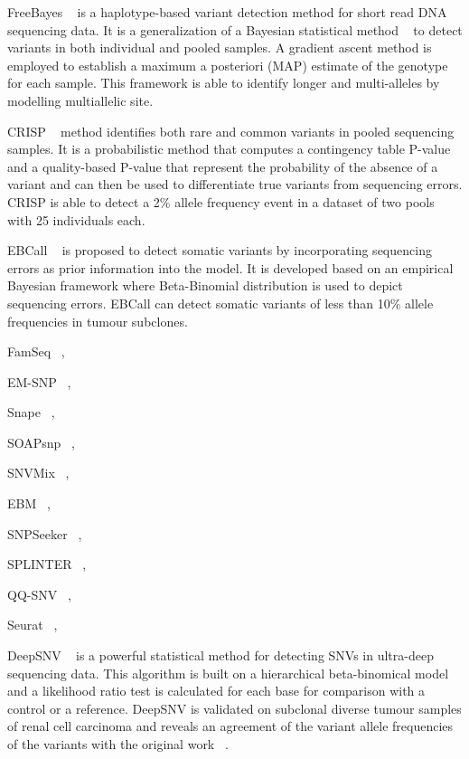 \documentclass[11pt,reqno]{amsart}
\begin{document}
FreeBayes ~\citep{Garrison2012} is a haplotype-based variant detection method for short read DNA sequencing data.
It is a generalization of a Bayesian statistical method ~\citep{marth1999general} to detect variants in both individual and pooled samples.
A gradient ascent method is employed to establish a maximum a posteriori (MAP) estimate of the genotype for each sample.
This framework is able to identify longer and multi-alleles by modelling multiallelic site.

CRISP ~\citep{Bansal2010} method identifies both rare and common variants in pooled sequencing samples.
It is a probabilistic method that computes a contingency table P-value and a quality-based P-value that represent the probability of the absence of a variant and can then be used to differentiate true variants from sequencing errors.
CRISP is able to detect a 2\% allele frequency event in a dataset of two pools with 25 individuals each.

EBCall ~\citep{Shiraishi2013} is proposed to detect somatic variants by incorporating sequencing errors as prior information into the model.
It is developed based on an empirical Bayesian framework where Beta-Binomial distribution is used to depict sequencing errors.
EBCall can detect somatic variants of less than 10\% allele frequencies in tumour subclones.

FamSeq ~\citep{Peng2013},

EM-SNP ~\citep{Chen2013},

Snape ~\citep{Raineri2012},

SOAPsnp ~\citep{Li2009},

SNVMix ~\citep{Goya2010},

EBM ~\citep{Zhou2012},

SNPSeeker ~\citep{Druley2009},

SPLINTER ~\citep{Spencer2014},

QQ-SNV ~\citep{VanderBorght2015},

Seurat ~\citep{Christoforides2013},

DeepSNV ~\citep{gerstung2012reliable} is a powerful statistical method for detecting SNVs in ultra-deep sequencing data.
This algorithm is built on a hierarchical beta-binomical model and a likelihood ratio test is calculated for each base for comparison with a control or a reference.
DeepSNV is validated on subclonal diverse tumour samples of renal cell carcinoma and reveals an agreement of the variant allele frequencies of the variants with the original work ~\citep{gerstung2012reliable}.
\end{document}
